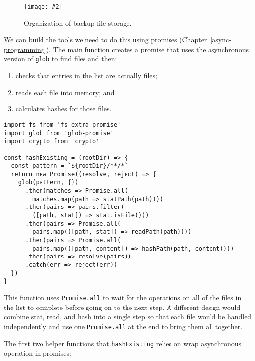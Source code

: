 \documentclass[krantzl]{krantz}
\newcommand{\figpdf}[4]{\begin{figure}%
\centering%
\texttt{[image: \#2]}%
\caption{#3}%
\label{#1}%
\end{figure}}
\newcommand{\chapref}[1]{Chapter~\ref{#1}}
\begin{document}
\figpdf{file-backup-storage}{./file-backup/storage.pdf}{Organization of backup file storage.}{0.6}


We can build the tools we need to do this using promises (\chapref{async-programming}).
The main function creates a promise that uses the asynchronous version of \texttt{glob} to find files
and then:

\begin{enumerate}

\item 

checks that entries in the list are actually files;



\item 

reads each file into memory; and



\item 

calculates hashes for those files.



\end{enumerate}


\begin{lstlisting}[frame=tblr]
import fs from 'fs-extra-promise'
import glob from 'glob-promise'
import crypto from 'crypto'

const hashExisting = (rootDir) => {
  const pattern = `${rootDir}/**/*`
  return new Promise((resolve, reject) => {
    glob(pattern, {})
      .then(matches => Promise.all(
        matches.map(path => statPath(path))))
      .then(pairs => pairs.filter(
        ([path, stat]) => stat.isFile()))
      .then(pairs => Promise.all(
        pairs.map(([path, stat]) => readPath(path))))
      .then(pairs => Promise.all(
        pairs.map(([path, content]) => hashPath(path, content))))
      .then(pairs => resolve(pairs))
      .catch(err => reject(err))
  })
}
\end{lstlisting}



\noindent This function uses \texttt{Promise.all}
to wait for the operations on all of the files in the list to complete
before going on to the next step.
A different design would combine stat, read, and hash into a single step
so that each file would be handled independently
and use one \texttt{Promise.all} at the end to bring them all together.


The first two helper functions that \texttt{hashExisting} relies on
wrap asynchronous operation in promises:
\end{document}
